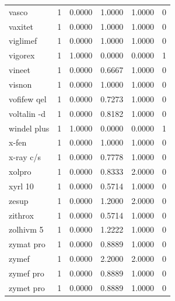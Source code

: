 \begin{longtable}{p{3.0cm}rrrrr}
vasco & 1 & 0.0000 & 1.0000 & 1.0000 & 0 \\
vaxitet & 1 & 0.0000 & 1.0000 & 1.0000 & 0 \\
viglimef & 1 & 0.0000 & 1.0000 & 1.0000 & 0 \\
vigorex & 1 & 1.0000 & 0.0000 & 0.0000 & 1 \\
vineet & 1 & 0.0000 & 0.6667 & 1.0000 & 0 \\
visnon & 1 & 0.0000 & 1.0000 & 1.0000 & 0 \\
vofifew qel & 1 & 0.0000 & 0.7273 & 1.0000 & 0 \\
voltalin -d & 1 & 0.0000 & 0.8182 & 1.0000 & 0 \\
windel plus & 1 & 1.0000 & 0.0000 & 0.0000 & 1 \\
x-fen & 1 & 0.0000 & 1.0000 & 1.0000 & 0 \\
x-ray c/s & 1 & 0.0000 & 0.7778 & 1.0000 & 0 \\
xolpro & 1 & 0.0000 & 0.8333 & 2.0000 & 0 \\
xyrl 10 & 1 & 0.0000 & 0.5714 & 1.0000 & 0 \\
zesup & 1 & 0.0000 & 1.2000 & 2.0000 & 0 \\
zithrox & 1 & 0.0000 & 0.5714 & 1.0000 & 0 \\
zolhivm 5 & 1 & 0.0000 & 1.2222 & 1.0000 & 0 \\
zymat pro & 1 & 0.0000 & 0.8889 & 1.0000 & 0 \\
zymef & 1 & 0.0000 & 2.2000 & 2.0000 & 0 \\
zymef pro & 1 & 0.0000 & 0.8889 & 1.0000 & 0 \\
zymet pro & 1 & 0.0000 & 0.8889 & 1.0000 & 0 \\
\end{longtable}
\endgroup

